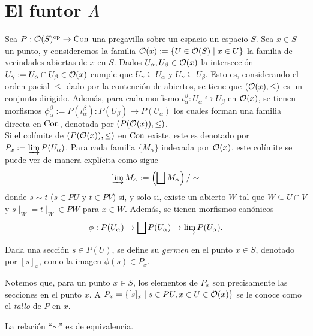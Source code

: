 \section{El funtor $\Lambda$}
Sea $P:{\mathcal O}(S)^{{\mathrm{op}}}\to{\mathrm{Con}}$ una pregavilla sobre un espacio un espacio $S$. Sea $x\in S$ un punto, y consideremos la familia ${\mathcal O}(x):=\{U\in {\mathcal O}(S)\mid x\in U\}$ la familia de vecindades abiertas de $x$ en $S$. Dados $U_\alpha, U_\beta\in {\mathcal O}(x)$ la intersección $U_\gamma:=U_\alpha\cap U_\beta\in{\mathcal O}(x)$ cumple que $U_\gamma\subseteq U_\alpha$ y $U_\gamma\subseteq U_\beta$. Esto es, considerando el orden pacial $\leq$ dado por la contención de abiertos, se tiene que $({\mathcal O}(x),\leq)$ es un conjunto dirigido. Además, para cada morfismo  $\iota^\beta_\alpha:U_\alpha\hookrightarrow U_\beta$ en ${\mathcal O}(x)$, se tienen morfismos $\phi^\beta_\alpha:= P(\iota^\beta_\alpha): P(U_\beta)\to P(U_\alpha)$ los cuales forman una familia directa en ${\mathrm{Con}}$, denotada por $(P({\mathcal O}(x)),\leq)$. \\
Si el colímite de $(P({\mathcal O}(x)), \leq )$ en ${\mathrm{Con}}$ existe, este es denotado por $P_x:=\varinjlim P(U_\alpha)$. Para cada familia $\{M_\alpha\}$ indexada por ${\mathcal O}(x)$, este colímite se puede ver de manera explícita como sigue 
\begin{equation*}
     \varinjlim M_\alpha:=\left(\bigsqcup M_\alpha\right)/\sim
\end{equation*}
donde $s\sim t$ ($s\in PU$ y $t\in PV$) si, y solo si, existe un abierto $W$ tal que $W\subseteq U\cap V$ y  $s\mid_W=t\mid_W\in PW$ para $x\in W$. Además, se tienen morfismos canónicos 
\begin{eqnarray*}
    \phi:P(U_\alpha)\to\bigsqcup P(U_\alpha)\to\varinjlim P(U_\alpha).
\end{eqnarray*}
\begin{definition}[Germen]
    Dada una sección $s\in P(U)$, se define su \emph{germen} en el punto $x\in S$, denotado por $[s]_x$, como la imagen  $\phi(s)\in P_x$. 
\end{definition}
Notemos que, para un punto $x\in S$, los elementos de $P_x$ son precisamente las secciones en el punto $x$. A $P_x=\{[s]_x\mid s\in PU, x\in U\in{\mathcal O}(x)\}$ se le conoce como el \emph{tallo} de $P$ en $x$. 
\begin{lema}
    La relación ``$\sim$'' es de equivalencia. 
\end{lema}
